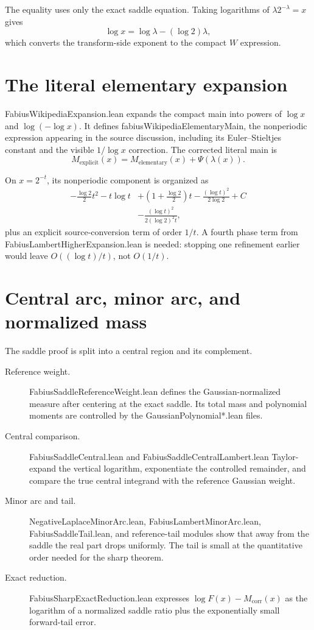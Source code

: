 \documentclass[11pt,a4paper,openany]{book}
\def\module#1{#1.lean}
\def\decl#1{#1}
\newcommand{\module}[1]{\nolinkurl{#1.lean}}
\newcommand{\decl}[1]{\texttt{\detokenize{#1}}}
\begin{document}
The equality uses only the exact saddle equation.  Taking logarithms of
$\lambda2^{-\lambda}=x$ gives
\[
 \log x=\log\lambda-(\log2)\lambda,
\]
which converts the transform-side exponent to the compact $W$ expression.

\section{The literal elementary expansion}
\module{FabiusWikipediaExpansion} expands the compact main into powers of
$\log x$ and $\log(-\log x)$.  It defines
\decl{fabiusWikipediaElementaryMain}, the nonperiodic expression appearing in
the source discussion, including its Euler--Stieltjes constant and the visible
$1/\log x$ correction.  The corrected literal main is
\[
 M_{\mathrm{explicit}}(x)
 =M_{\mathrm{elementary}}(x)+\Psi(\lambda(x)).
\]

On $x=2^{-t}$, its nonperiodic component is organized as
\begin{align*}
 -\frac{\log2}{2}t^2-t\log t
 &+\left(1+\frac{\log2}{2}\right)t
 -\frac{(\log t)^2}{2\log2}+C\\
 &-\frac{(\log t)^2}{2(\log2)^2t},
\end{align*}
plus an explicit source-conversion term of order $1/t$.  A fourth phase term
from \module{FabiusLambertHigherExpansion} is needed: stopping one refinement
earlier would leave $O((\log t)/t)$, not $O(1/t)$.

\section{Central arc, minor arc, and normalized mass}
The saddle proof is split into a central region and its complement.

\begin{description}
\item[Reference weight.] \module{FabiusSaddleReferenceWeight} defines the
Gaussian-normalized measure after centering at the exact saddle.  Its total
mass and polynomial moments are controlled by the \module{GaussianPolynomial*}
files.
\item[Central comparison.] \module{FabiusSaddleCentral} and
\module{FabiusSaddleCentralLambert} Taylor-expand the vertical logarithm,
exponentiate the controlled remainder, and compare the true central integrand
with the reference Gaussian weight.
\item[Minor arc and tail.] \module{NegativeLaplaceMinorArc},
\module{FabiusLambertMinorArc}, \module{FabiusSaddleTail}, and reference-tail
modules show that away from the saddle the real part drops uniformly.  The
tail is small at the quantitative order needed for the sharp theorem.
\item[Exact reduction.] \module{FabiusSharpExactReduction} expresses
$\log F(x)-M_{\mathrm{corr}}(x)$ as the logarithm of a normalized saddle ratio
plus the exponentially small forward-tail error.
\end{description}
\end{document}
